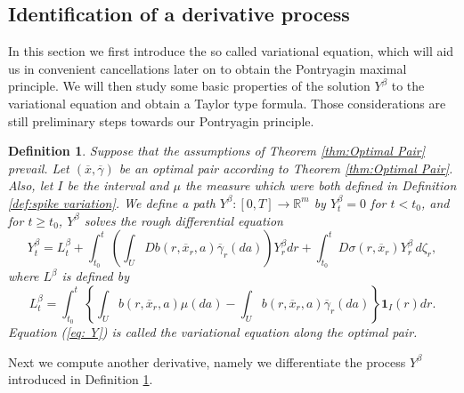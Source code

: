 \documentclass[12pt,reqno]{amsart}
\numberwithin{equation}{section}  %
\newcommand{\1}{{\bf 1}}
\newcommand{\2}{{\bf 2}}
\newcommand{\R}{\mathbb R}
\newcommand{\ga}{\gamma}
\newcommand{\lp}{\left(}
\newcommand{\rp}{\right)}
\newtheorem{definition}[theorem]{Definition}
\theoremstyle{remark}
\theoremstyle{remark}
\begin{document}
\subsection{Identification of a derivative process}\label{sec:identification-derivative}
In this section 
we first introduce the so called variational equation, which will aid us in convenient cancellations later on to obtain the Pontryagin maximal principle. We will then study some basic properties of the solution $Y^{\beta}$ to the variational equation and obtain a Taylor type formula. Those considerations are still preliminary steps towards our Pontryagin principle.

\begin{definition} \label{def: variational equation}
 Suppose that the assumptions of Theorem \ref{thm:Optimal Pair} prevail. Let $(\overline{x},\overline{\gamma})$ be an optimal pair according to Theorem \ref{thm:Optimal Pair}. Also, let $I$ be the interval and $\mu$ the measure which were both defined in Definition \ref{def:spike variation}. We define a path $Y^{\beta}\colon[0,T]\to\R^m$ by $Y_{t}^{\beta}=0$ for $t<t_{0}$, and for $t\geq t_{0}$, $Y^{\beta}$ solves the rough differential equation
  \begin{equation}\label{eq: Y}
Y_{t}^{\beta}=L_{t}^{\beta}+\int_{t_0}^{t}\lp\int_{U}Db(r,\overline{x}_{r},a)\overline{\ga}_{r}(da) \rp Y_{r}^{\beta}dr + \int_{t_{0}}^{t}D\sigma(r,\overline{x}_{r})Y_{r}^{\beta}\,d\zeta_{r},
 \end{equation}
 where $L^{\beta}$ is defined by
 \[L_{t}^{\beta}=\int_{t_{0}}^{t} \left\{ \int_{U}b(r,\overline{x}_{r},a)\mu(da)-\int_{U}b(r,\overline{x}_{r},a)\overline{\gamma}_{r}(da) \right\}\mathbf{1}_{I}(r)dr.\]
 Equation (\ref{eq: Y}) is called the variational equation along the optimal pair.
\end{definition}



Next we compute another derivative, namely we differentiate the process $Y^{\beta}$ introduced in Definition \ref{def: variational equation}.
\end{document}
